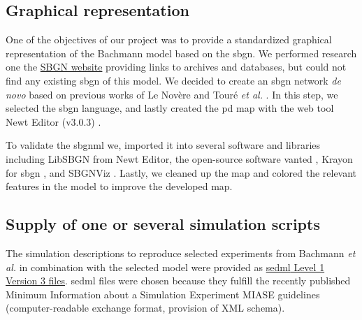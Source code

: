 \subsection*{Graphical representation}

One of the objectives of our project was to provide a standardized graphical representation of the Bachmann model based on the \ac{sbgn}. We performed research one the \hyperlink{https://sbgn.github.io/software}{SBGN website} providing links to archives and databases, but could not find any existing \ac{sbgn} of this model. We decided to create an \ac{sbgn} network \textit{de novo} based on previous works of Le Novère \cite{sbgnnovere} and Touré \textit{et al.} \cite{sbgntoure}. In this step, we selected the \ac{sbgn} language, and lastly created the \ac{pd} map with the web tool Newt Editor (v3.0.3) \cite{newteditor}.

To validate the \ac{sbgnml} we, imported it into several software and libraries including LibSBGN from Newt Editor, the open-source software \ac{vanted} \cite{vanted}, Krayon for \ac{sbgn} \cite{krayon}, and SBGNViz \cite{sbgnviz}. Lastly, we cleaned up the map and colored the relevant features in the model to improve the developed map.

\subsection*{Supply of one or several simulation scripts}

The simulation descriptions to reproduce selected experiments from Bachmann \textit{et al.} \cite{bachmannmodel} in combination with the selected model were provided as \hyperlink{https://sed-ml.org/}{\acs{sedml} Level 1 Version 3 files}. \ac{sedml} files were chosen because they fulfill
the recently published Minimum Information about a Simulation Experiment \ac{MIASE} guidelines (computer-readable exchange format, provision of XML schema). 

